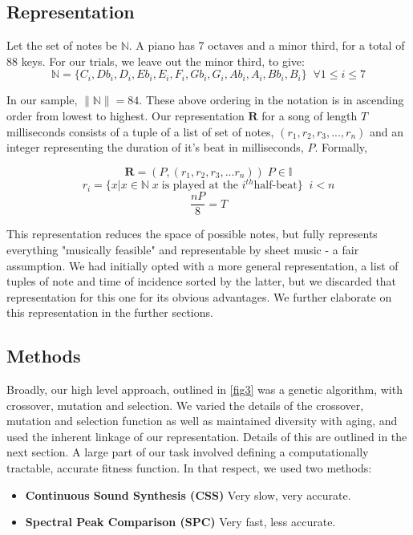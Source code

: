 \documentclass{pnastwo}
\begin{document}
\begin{article}
\subsection{Representation}
Let the set of notes be $\mathbb{N}$. A piano has 7 octaves and a minor third, for a total of 88 keys. For our trials, we leave out the minor third, to give: 
$$\mathbb{N} = \{ C_i,  Db_i, D_i, Eb_i, E_i, F_i, Gb_i, G_i, Ab_i, A_i, Bb_i, B_i \}  \; \; \forall 1 \leq i \leq 7 $$

In our sample, $\|\mathbb{N}\| = 84 $. These above ordering in the notation is in ascending order from lowest to highest. Our representation $\mathbf{R}$ for a song of length $T$ milliseconds consists of a tuple of a list of set of notes, $(r_1, r_2, r_3, ... , r_n)$ and an integer representing the duration of it's beat in milliseconds, $P$. Formally, 

$$ \mathbf{R} = (P, (r_1, r_2, r_3, ... r_n ) ) \; P \in \mathbb{I}  $$
$$ r_i = \{ x | x \in \mathbb{N} \;x \;\text{is played at the } i^{th} \text{half-beat} \} \; \;  i < n$$
$$ \frac{nP}{8} = T $$

This representation reduces the space of possible notes, but fully represents everything "musically feasible" and representable by sheet music - a fair assumption. We had initially opted with a more general representation, a list of tuples of note and time of incidence sorted by the latter, but we discarded that representation for this one for its obvious advantages. We further elaborate on this representation in the further sections. 
\subsection{Methods}
Broadly, our high level approach, outlined in \ref{fig3} was a genetic algorithm, with crossover, mutation and selection. We varied the details of the crossover, mutation and selection function as well as maintained diversity with aging, and used the inherent linkage of our representation. Details of this are outlined in the next section. A large part of our task involved defining a computationally tractable, accurate fitness function. In that respect, we used two methods:
\begin{itemize}
\item \textbf{Continuous Sound Synthesis (CSS)} Very slow, very accurate.
\item \textbf{Spectral Peak Comparison (SPC)} Very fast, less accurate.
\end{itemize}

\end{article}
\end{document}
